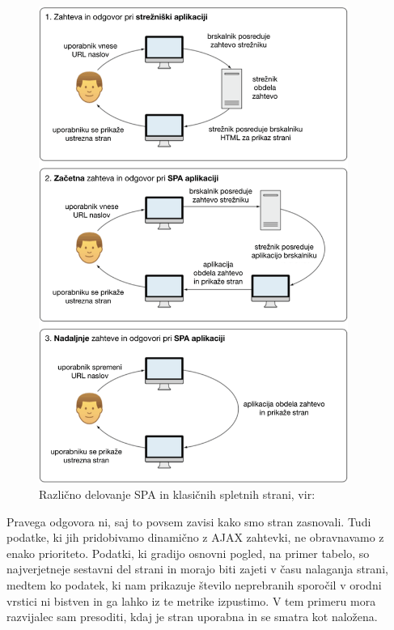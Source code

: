 \documentclass[a4paper, 12pt]{book}
\begin{document}
\begin{figure}[!htb]
	\begin{center}
		\includegraphics[width=0.9\textwidth]{Razlicni_nacini_obdelave_zahtev.png}
	\end{center}
	\caption{Različno delovanje SPA in klasičnih spletnih strani, vir: \cite{sp_skripta}}
	\label{img:diff_multipage_spa}
\end{figure}

Pravega odgovora ni, saj to povsem zavisi kako smo stran zasnovali. Tudi podatke, ki jih pridobivamo dinamično z AJAX zahtevki, ne obravnavamo z enako prioriteto. Podatki, ki gradijo osnovni pogled, na primer tabelo, so najverjetneje sestavni del strani in morajo biti zajeti v času nalaganja strani, medtem ko podatek, ki nam prikazuje število neprebranih sporočil v orodni vrstici ni bistven in ga lahko iz te metrike izpustimo. V tem primeru mora razvijalec sam presoditi, kdaj je stran uporabna in se smatra kot naložena.
\end{document}
